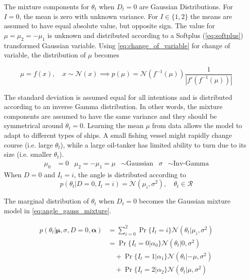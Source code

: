 The mixture components for $\theta_t$ when $D_t=0$ are Gaussian Distributions. For $I=0$, the mean is zero with unknown variance. For $I \in \{1, 2\}$ the means are assumed to have equal absolute value, but opposite sign. The value for $\mu = \mu_2 = -\mu_1$ is unknown and distributed according to a Softplus (\cref{eq:softplus}) transformed Gaussian variable. Using \cref{eq:change_of_variable} for change of variable, the distribution of $\mu$ becomes 

\begin{equation}
    \mu = f(x), \quad x \sim \mathcal{N}(x) \implies p(\mu) = \mathcal{N}(f^{-1}(\mu)) \frac{1}{|f'(f^{-1}(\mu))|} 
\end{equation}

The standard deviation is assumed equal for all intentions and is distributed according to an inverse Gamma distribution. In other words, the mixture components are assumed to have the same variance and they should be symmetrical around $\theta_t=0$.
Learning the mean $\mu$ from data allows the model to adapt to different types of ships. A small fishing vessel might rapidly change course (i.e. large $\theta_t$), while a large oil-tanker has limited ability to turn due to its size (i.e. smaller $\theta_t$). 
\begin{align}
    \mu_0 &= 0 &  \mu_{2} = - \mu_{1} = \mu &\sim \text{Gaussian} & \sigma &\sim \text{Inv-Gamma}
\end{align}
When $D=0$ and $I_t=i$, the angle is distributed according to
\begin{equation}\label{eq:theta_intention_mixture}
    p(\theta_t | D=0, I_t=i) = \mathcal{N}(\mu_i, \sigma^2), \quad \theta_t \in \mathcal{R}
\end{equation}

The marginal distribution of $\theta_t$ when $D_t=0$ becomes the Gaussian mixture model in \cref{eq:angle_gauss_mixture}.

\begin{align}\label{eq:angle_gauss_mixture}
\begin{split}
    p(\theta_t | \boldsymbol{\mu}, \sigma, D=0, \boldsymbol{\alpha}) &= \sum_{i=0}^2 \Pr\{I_t=i\}\mathcal{N}(\theta_t | \mu_i, \sigma^2) \\
    &=\Pr\{I_t=0 | \alpha_0\}\mathcal{N}(\theta_t | 0, \sigma^2)\\
    &\quad+\Pr\{I_t=1 | \alpha_1\}\mathcal{N}(\theta_t | -\mu, \sigma^2)\\
    &\quad+\Pr\{I_t=2 | \alpha_2\}\mathcal{N}(\theta_t | \mu, \sigma^2)
\end{split}
\end{align}

